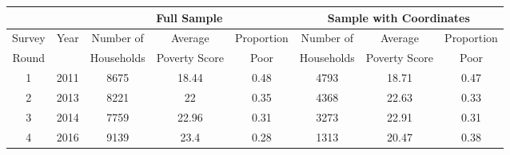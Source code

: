 \begin{tabular}{cc|ccc|ccc} 
\hline 
       &      & \multicolumn{3}{c|}{Full Sample} & \multicolumn{3}{c}{Sample with Coordinates} \\ 
\hline 
Survey & Year & Number of  & Average       & Proportion & Number of  & Average       & Proportion \\ 
Round  &      & Households & Poverty Score & Poor       & Households & Poverty Score & Poor \\ 
\hline 
1 & 2011 & 8675 & 18.44 & 0.48 & 4793 & 18.71 & 0.47  \\ 
2 & 2013 & 8221 & 22 & 0.35 & 4368 & 22.63 & 0.33  \\ 
3 & 2014 & 7759 & 22.96 & 0.31 & 3273 & 22.91 & 0.31  \\ 
4 & 2016 & 9139 & 23.4 & 0.28 & 1313 & 20.47 & 0.38  \\ 
\hline 
\end{tabular} 
